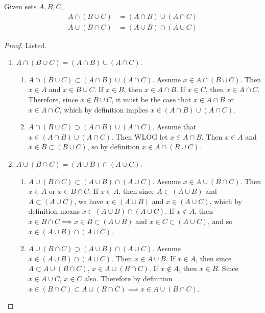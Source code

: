   \begin{theorem}[Distributivity]
    Given sets $A, B, C$, 
    \begin{align}
      A \cap (B \cup C) & = (A \cap B) \cup (A \cap C) \\
      A \cup (B \cap C) & = (A \cup B) \cap (A \cup C)
    \end{align}
  \end{theorem}
  \begin{proof}
    Listed. 
    \begin{enumerate}
      \item $A \cap (B \cup C) = (A \cap B) \cup (A \cap C)$. 
        \begin{enumerate}
          \item $A \cap (B \cup C) \subset (A \cap B) \cup (A \cap C)$. Assume $x \in A \cap (B \cup C)$. Then $x \in A$ and $x \in B \cup C$. If $x \in B$, then $x \in A \cap B$. If $x \in C$, then $x \in A \cap C$. Therefore, since $x \in B \cup C$, it must be the case that $x \in A \cap B$ or $x \in A \cap C$, which by definition implies $x \in (A \cap B) \cup (A \cap C)$. 

          \item $A \cap (B \cup C) \supset (A \cap B) \cup (A \cap C)$. Assume that $x \in (A \cap B) \cup (A \cap C)$. Then WLOG let $x \in A \cap B$. Then $x \in A$ and $x \in B \subset (B \cup C)$, so by definition $x \in A \cap (B \cup C)$. 
        \end{enumerate}

      \item $A \cup (B \cap C) = (A \cup B) \cap (A \cup C)$.
        \begin{enumerate}
          \item $A \cup (B \cap C) \subset (A \cup B) \cap (A \cup C)$. Assume $x \in A \cup(B \cap C)$. Then $x \in A$ or $x \in B \cap C$. If $x \in A$, then since $A \subset (A \cup B)$ and $A \subset (A \cup C)$, we have $x \in (A \cup B)$ and $x \in (A \cup C)$, which by definition means $x \in (A \cup B) \cap (A \cup C)$. If $x \not\in A$, then $x \in B \cap C \implies x \in B \subset (A \cup B)$ and $x \in C \subset (A \cup C)$, and so $x \in (A \cup B) \cap (A \cup C)$. 

          \item $A \cup (B \cap C) \supset (A \cup B) \cap (A \cup C)$. Assume $x \in (A \cup B) \cap (A \cup C)$. Then $x \in A \cup B$. If $x \in A$, then since $A \subset A \cup (B \cap C)$, $x \in A \cup (B \cap C)$. If $x \not\in A$, then $x \in B$. Since $x \in A \cup C$, $x \in C$ also. Therefore by definition $x \in (B \cap C) \subset A \cup (B \cap C) \implies x \in A \cup (B \cap C)$. 
        \end{enumerate}
    \end{enumerate}
  \end{proof}

